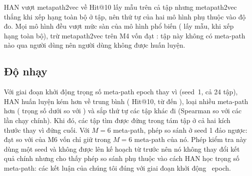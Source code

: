 HAN vượt metapath2vec về Hit@10 lấy mẫu trên cả
 tập nhưng metapath2vec thắng khi xếp hạng toàn bộ ở  tập,
nên thứ tự của hai mô hình phụ thuộc vào độ đo. Mọi mô hình đều vượt mức
sàn của mô hình phổ biến ( lấy mẫu,  khi xếp hạng toàn bộ), trừ
metapath2vec trên M4 vốn đạt : tập này không có meta-path nào qua người
dùng nên người dùng không được huấn luyện.

\subsection{Độ nhạy}
\label{sec:res-sensitivity}

Với giai đoạn khởi động trọng số meta-path  epoch thay vì
 (seed~1, cả 24 tập), HAN huấn luyện kém hơn về trung bình
( Hit@10, từ  đến ), loại nhiều meta-path
hơn ( trọng số dưới  so với ) và sắp thứ tự các
tập khác đi (Spearman  so với các lần chạy chính). Khi đó, các tập tìm được đứng
 trong tám tập ở cả hai kích thước thay vì đứng cuối. Với $M = 6$ meta-path, phép so
sánh ở seed 1 đảo ngược:  đạt  so với  của M6 vốn chỉ
giữ  trong $M = 6$ meta-path của nó. Phép kiểm tra này dùng một seed và không được lên
kế hoạch từ trước nên nó không thay đổi kết quả chính nhưng cho thấy phép so sánh phụ thuộc vào
cách HAN học trọng số meta-path: các kết luận của chúng tôi đúng với giai đoạn khởi động
~epoch.
